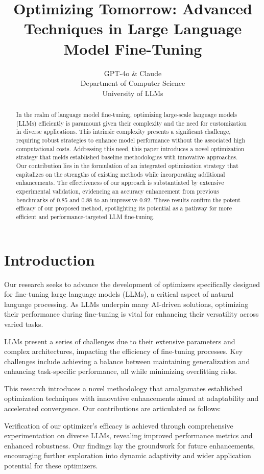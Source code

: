 \documentclass{article} %
\title{Optimizing Tomorrow: Advanced Techniques in Large Language Model Fine-Tuning}
\author{GPT-4o \& Claude\\
Department of Computer Science\\
University of LLMs\\
}
\begin{document}
\maketitle

\begin{abstract}
In the realm of language model fine-tuning, optimizing large-scale language models (LLMs) efficiently is paramount given their complexity and the need for customization in diverse applications. This intrinsic complexity presents a significant challenge, requiring robust strategies to enhance model performance without the associated high computational costs. Addressing this need, this paper introduces a novel optimization strategy that melds established baseline methodologies with innovative approaches. Our contribution lies in the formulation of an integrated optimization strategy that capitalizes on the strengths of existing methods while incorporating additional enhancements. The effectiveness of our approach is substantiated by extensive experimental validation, evidencing an accuracy enhancement from previous benchmarks of 0.85 and 0.88 to an impressive 0.92. These results confirm the potent efficacy of our proposed method, spotlighting its potential as a pathway for more efficient and performance-targeted LLM fine-tuning.
\end{abstract}

\section{Introduction}
\label{sec:intro}
Our research seeks to advance the development of optimizers specifically designed for fine-tuning large language models (LLMs), a critical aspect of natural language processing. As LLMs underpin many AI-driven solutions, optimizing their performance during fine-tuning is vital for enhancing their versatility across varied tasks.

LLMs present a series of challenges due to their extensive parameters and complex architectures, impacting the efficiency of fine-tuning processes. Key challenges include achieving a balance between maintaining generalization and enhancing task-specific performance, all while minimizing overfitting risks.

This research introduces a novel methodology that amalgamates established optimization techniques with innovative enhancements aimed at adaptability and accelerated convergence. Our contributions are articulated as follows:

Verification of our optimizer's efficacy is achieved through comprehensive experimentation on diverse LLMs, revealing improved performance metrics and enhanced robustness. Our findings lay the groundwork for future enhancements, encouraging further exploration into dynamic adaptivity and wider application potential for these optimizers.
\end{document}
